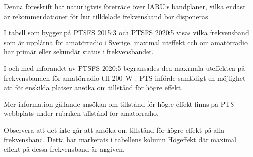 Denna föreskrift har naturligtvis företräde över IARU:s bandplaner, vilka
endast är rekommendationer för hur tilldelade frekvensband bör disponeras.

I tabell  som bygger på PTSFS 2015:3 och PTSFS 2020:5 visas
vilka frekvensband som är upplåtna för amatörradio i Sverige, maximal uteffekt
och om amatörradio har primär eller sekundär status i frekvensbandet.

I och med införandet av PTSFS 2020:5 begränsades den maximala uteffekten på
frekvensbanden för amatörradio till \qty{200}{\watt} \pep.
PTS införde samtidigt en möjlighet att för enskilda platser ansöka om tillstånd
för högre effekt.

Mer information gällande ansökan om tillstånd för högre effekt finns på PTS
webbplats under rubriken tillstånd för amatörradio.

Observera att det inte går att ansöka om tillstånd för högre effekt på alla
frekvensband. Detta har markerats i tabellens kolumn Högeffekt där maximal
effekt på dessa frekvensband är angiven.

